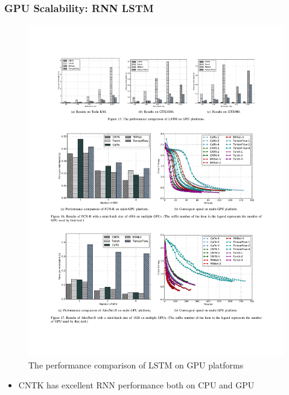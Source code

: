 \begin{frame}
	\MyLogo
	\frametitle{GPU Scalability: RNN LSTM}
	
	\begin{figure}[htbp] 
		\includegraphics[width=\linewidth]{figures/LSTM2.pdf} 
		\caption{The performance comparison of LSTM on GPU platforms}
	\end{figure}

\vskip -10pt
\begin{mdframed}[style=mystyle1]
\begin{itemize}
\item CNTK has excellent RNN performance both on CPU and GPU
\end{itemize}
\end{mdframed}
	
\end{frame}